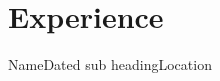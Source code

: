 \section{Experience}
\resumeSubHeadingListStart

    \resumeSubheading
    {Name}{Dated}
    {sub heading}{Location}
    \resumeItemListStart
       
    \resumeItemListEnd
\resumeSubHeadingListEnd
